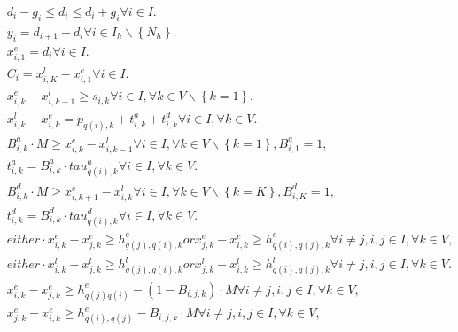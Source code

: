 \begin{align}
  & {d}_{i} - g_{i} \leq d_{i} \leq {d}_{i} + g_{i} \forall i \in I . \tag{eq\_0001} \\
  & y_{i} = d_{i + 1} - d_{i} \forall i \in I_{h} \backslash \left\{N_{h}\right\} . \tag{eq\_0002} \\
  & x_{i , 1}^{e} = d_{i} \forall i \in I . \tag{eq\_0003} \\
  & C_{i} = x_{i , K}^{l} - x_{i , 1}^{e} \forall i \in I . \tag{eq\_0004} \\
  & x_{i , k}^{e} - x_{i , k - 1}^{l} \geq s_{i , k} \forall i \in I , \forall k \in V \backslash \left\{k = 1\right\} . \tag{eq\_0005} \\
  & x_{i , k}^{l} - x_{i , k}^{e} = p_{q \left(i\right) , k} + t_{i , k}^{a} + t_{i , k}^{d} \forall i \in I , \forall k \in V . \tag{eq\_0006} \\
  & B_{i , k}^{a} \cdot M \geq x_{i , k}^{e} - x_{i , k - 1}^{l} \forall i \in I , \forall k \in V \backslash \left\{k = 1\right\} , B_{i , 1}^{a} = 1 , \tag{eq\_0007} \\
  & t_{i , k}^{a} = B_{i , k}^{a} \cdot \mathit{tau}_{q \left(i\right) , k}^{a} \forall i \in I , \forall k \in V . \tag{eq\_0008} \\
  & B_{i , k}^{d} \cdot M \geq x_{i , k + 1}^{e} - x_{i , k}^{l} \forall i \in I , \forall k \in V \backslash \left\{k = K\right\} , B_{i , K}^{d} = 1 , \tag{eq\_0009} \\
  & t_{i , k}^{d} = B_{i , k}^{d} \cdot \mathit{tau}_{q \left(i\right) , k}^{d} \forall i \in I , \forall k \in V . \tag{eq\_0010} \\
  & either \cdot x_{i , k}^{e} - x_{j , k}^{e} \geq h_{q \left(j\right) , q \left(i\right) , k}^{e} or x_{j , k}^{e} - x_{i , k}^{e} \geq h_{q \left(i\right) , q \left(j\right) , k}^{e} \forall i \neq j , i , j \in I , \forall k \in V , \tag{eq\_0011} \\
  & either \cdot x_{i , k}^{l} - x_{j , k}^{l} \geq h_{q \left(j\right) , q \left(i\right) , k}^{l} or x_{j , k}^{l} - x_{i , k}^{l} \geq h_{q \left(i\right) , q \left(j\right) , k}^{l} \forall i \neq j , i , j \in I , \forall k \in V . \tag{eq\_0012} \\
  & x_{i , k}^{e} - x_{j , k}^{e} \geq h_{q \left(j\right) q \left(i\right)}^{e} - \left(1 - B_{i , j , k}\right) \cdot M \forall i \neq j , i , j \in I , \forall k \in V , \tag{eq\_0013} \\
  & x_{j , k}^{e} - x_{i , k}^{e} \geq h_{q \left(i\right) , q \left(j\right)}^{e} - B_{i , j , k} \cdot M \forall i \neq j , i , j \in I , \forall k \in V , \tag{eq\_0014} \\

\end{align}
